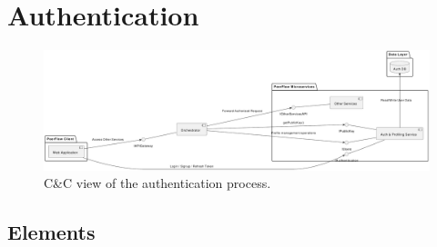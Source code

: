 \clearpage

\section{Authentication}

\begin{figure}[h]
    \centering
    \includegraphics[width=0.9\linewidth]{Architettura/imgs/auth_cnc.pdf}
    \caption{C\&C view of the authentication process.}
    \label{fig:ccAuthentication}
\end{figure}

\subsection{Elements}

